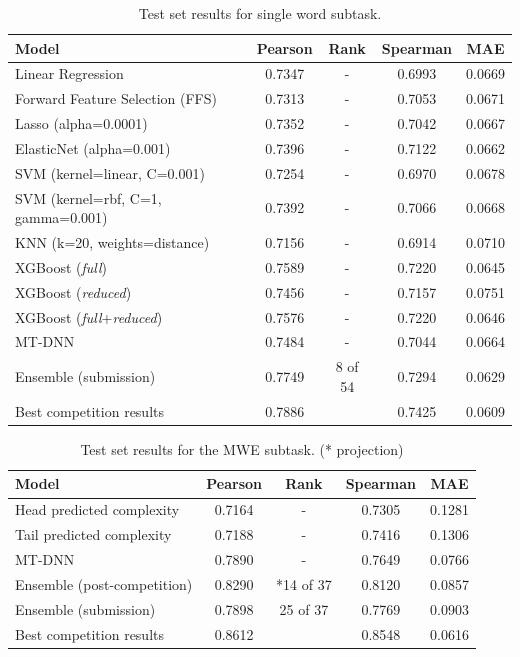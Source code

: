 \documentclass[11pt,a4paper]{article}
\begin{document}
\begin{table}[t]
  \centering
  \begin{tabular}{lcccc}
  \hline \textbf{Model} & \textbf{Pearson} & \textbf{Rank} & \textbf{Spearman} & \textbf{MAE} \\ \hline
  Linear Regression	& 0.7347 & - &	0.6993 &	0.0669 \\
  Forward Feature Selection (FFS)	& 0.7313 & - &	0.7053 & 0.0671 \\
  Lasso (alpha=0.0001) &	0.7352 & - &	0.7042 & 	0.0667 \\
  ElasticNet (alpha=0.001) &	0.7396 & - &	0.7122 &	0.0662 \\
  SVM (kernel=linear, C=0.001) &	0.7254 & - &	0.6970 &	0.0678 \\
  SVM (kernel=rbf, C=1, gamma=0.001) &	0.7392 & - &	0.7066 &	0.0668 \\
  KNN (k=20, weights=distance) &	0.7156 & -	& 0.6914 &	0.0710 \\
  \hline
  XGBoost (\textit{full}) &	0.7589 & - &	0.7220 &	0.0645 \\
  XGBoost (\textit{reduced}) &	0.7456 & - &	0.7157 &	0.0751 \\
  XGBoost (\textit{full}+\textit{reduced}) & 0.7576 & - & 0.7220 & 0.0646 \\
  MT-DNN & 0.7484 & -	& 0.7044 & 0.0664 \\
  Ensemble (submission) & 0.7749 & 8 of 54 & 0.7294 & 0.0629 \\
  \hline
  Best competition results & 0.7886 & & 0.7425 & 0.0609 \\ 
  \hline
  \end{tabular}
  \caption{\label{tab:single-word-results} Test set results for single word subtask. }
\end{table}

\begin{table}[t]
  \centering
  \begin{tabular}{lcccc}
  \hline \textbf{Model} & \textbf{Pearson} & \textbf{Rank} & \textbf{Spearman} & \textbf{MAE} \\ \hline
  Head predicted complexity & 0.7164 & - & 0.7305 & 0.1281 \\
  Tail predicted complexity & 0.7188 & - & 0.7416 & 0.1306 \\
  MT-DNN & 0.7890 & - & 0.7649 & 0.0766 \\
  Ensemble (post-competition) & 0.8290 & *14 of 37 & 0.8120 & 0.0857 \\
  Ensemble (submission) & 0.7898 & 25 of 37 & 0.7769 & 0.0903 \\
  \hline
  Best competition results & 0.8612 & &  0.8548 & 0.0616 \\ 
  \hline
  \end{tabular}
  \caption{\label{tab:multi-word-results} Test set results for the MWE subtask. (* projection)}
\end{table}
\end{document}

